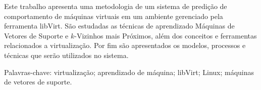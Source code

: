 \documentclass[font=plain,chapter=TITLE,section=Title,espaco=duplo,tocpage=plain,appendix=NAME,floatnumber=continuous]{abnt}
\begin{document}


\UTPCapa
\UTPFalsaFolhaDeRosto
\UTPFolhaDeRosto

\begin{resumo}
Este trabalho apresenta uma metodologia de um sistema de predição de
comportamento de máquinas virtuais em um ambiente gerenciado pela
ferramenta libVirt. São estudadas as técnicas de aprendizado Máquinas de
Vetores de Suporte e $k$-Vizinhos mais Próximos, além dos conceitos e
ferramentas relacionados a virtualização. Por fim são apresentados os
modelos, processos e técnicas que serão utilizados no sistema.

Palavras-chave: virtualização; aprendizado de máquina; libVirt; Linux;
máquinas de vetores de suporte.
\end{resumo}

\listoffigures
\listadequadros
\sumario




















\end{document}
